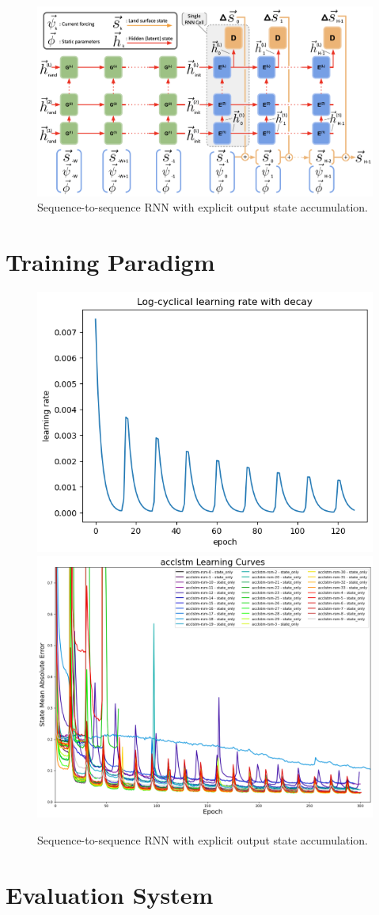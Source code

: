 \begin{figure}[h!]
    \centering
    \includegraphics[width=.95\linewidth]{figures/schematic_s2s-accumulator.png}

    \caption{Sequence-to-sequence RNN with explicit output state accumulation.}
    \label{s2s-default}
\end{figure}

\section{Training Paradigm}

\begin{figure}[h!]
    \centering
    \includegraphics[width=.48\linewidth]{figures/cyclical_lr_logarithmic.png}
    \includegraphics[width=.48\linewidth]{figures/learning-curves_acclstm.png}

    \caption{Sequence-to-sequence RNN with explicit output state accumulation.}
    \label{learning-rate}
\end{figure}

\section{Evaluation System}

